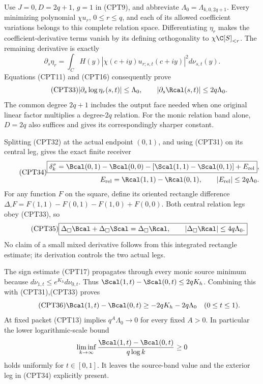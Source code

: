 Use \(J=0,D=2q+1\), \(g=1\) in (CPT9), and abbreviate
\(\Lambda_0=\Lambda_{k,0,2q+1}\).
Every minimizing polynomial \(\chi u_r\), \(0\le r\le q\),
and each of its allowed coefficient variations belongs to
this complete relation space.
Differentiating \(\eta_r\) makes the coefficient-derivative
terms vanish by its defining orthogonality to
\(\chi\C[S]_{<r}\).  The remaining derivative is exactly
\[
 \partial_s\eta_r
 =\int_C H(y)|\chi(c+iy)u_{r;s,t}(c+iy)|^2
                                             d\nu_{s,t}(y).
\]
Equations (CPT11) and (CPT16) consequently prove
\begin{equation}\tag{CPT33}
 |\partial_s\log\eta_r(s,t)|\le\Lambda_0,\qquad
 |\partial_s\Rcal(s,t)|\le2q\Lambda_0.
\end{equation}
The common degree \(2q+1\) includes the output face needed when
one original linear factor multiplies a degree-\(2q\) relation.
For the monic relation band alone, \(D=2q\) also suffices and
gives its correspondingly sharper constant.

Splitting (CPT32) at the actual endpoint \((0,1)\), and using
(CPT31) on its central leg, gives the exact finite receiver
\begin{equation}\tag{CPT34}
\begin{split}
 \boxed{\delta_k^\sigma
 =\Bcal(0,1)-\Bcal(0,0)
 -[\Scal(1,1)-\Scal(0,1)]+E_{\rm rel}},\\
 E_{\rm rel}=\Rcal(1,1)-\Rcal(0,1),\qquad
 |E_{\rm rel}|\le2q\Lambda_0.
\end{split}
\end{equation}
For any function \(F\) on the square, define its oriented
rectangle difference
\(\Delta_\square F=F(1,1)-F(0,1)-F(1,0)+F(0,0)\).
Both central relation legs obey (CPT33), so
\begin{equation}\tag{CPT35}
 \boxed{\Delta_\square\Bcal+\Delta_\square\Scal
       =\Delta_\square\Rcal,\qquad
 |\Delta_\square\Rcal|\le4q\Lambda_0.}
\end{equation}
No claim of a small mixed derivative follows from this integrated
rectangle estimate; its derivation controls the two actual legs.

The sign estimate (CPT17) propagates through every monic
source minimum because
\(d\nu_{1,t}\le e^{K_h}d\nu_{0,t}\).
Thus
\(\Scal(1,t)-\Scal(0,t)\le2qK_h\).
Combining this with (CPT31),(CPT33) proves
\begin{equation}\tag{CPT36}
 \Bcal(1,t)-\Bcal(0,t)\ge-2qK_h-2q\Lambda_0
 \quad(0\le t\le1).
\end{equation}
At fixed packet (CPT13) implies \(q^A\Lambda_0\to0\) for every
fixed \(A>0\).  In particular the lower logarithmic-scale bound
\[
 \liminf_{k\to\infty}
 \frac{\Bcal(1,t)-\Bcal(0,t)}{q\log k}\ge0
\]
holds uniformly for \(t\in[0,1]\).
It leaves the source-band value and the exterior leg in
(CPT34) explicitly present.

